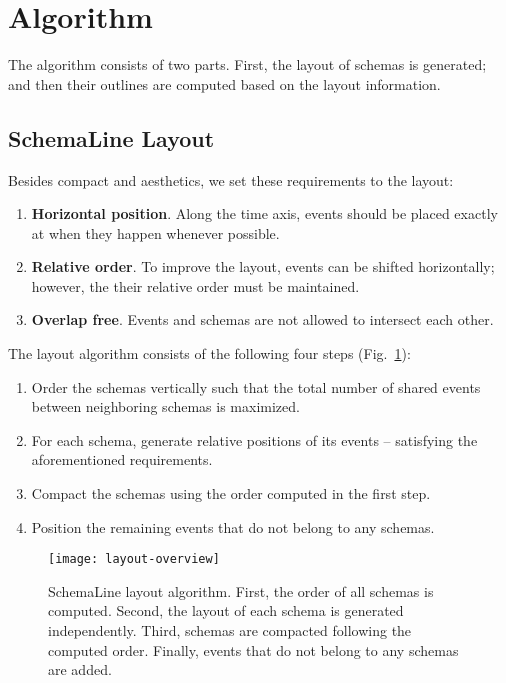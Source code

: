\section{Algorithm}
\label{sec:layout}

The algorithm consists of two parts. First, the layout of schemas is generated; and then their outlines are computed based on the layout information.

\subsection{SchemaLine Layout}
\label{sub:schema-layout}
Besides compact and aesthetics, we set these requirements to the layout: 
\begin{enumerate}
	\item \textbf{Horizontal position}. Along the time axis, events should be placed exactly at when they happen whenever possible.
	\item \textbf{Relative order}. To improve the layout, events can be shifted horizontally; however, the their relative order must be maintained. 
	\item \textbf{Overlap free}. Events and schemas are not allowed to intersect each other.
\end{enumerate}

The layout algorithm consists of the following four steps (Fig.~\ref{fig:layout-overview}):
\begin{enumerate} 
	\item Order the schemas vertically such that the total number of shared events between neighboring schemas is maximized.
	\item For each schema, generate relative positions of its events -- satisfying the aforementioned requirements.
	\item Compact the schemas using the order computed in the first step.
	\item Position the remaining events that do not belong to any schemas. 
\end{enumerate}

\begin{figure}[ht]
\centering
\texttt{[image: layout-overview]}
\caption{SchemaLine layout algorithm. First, the order of all schemas is computed. Second, the layout of each schema is generated independently. Third, schemas are compacted following the computed order. Finally, events that do not belong to any schemas are added.}
\label{fig:layout-overview}
\end{figure}

